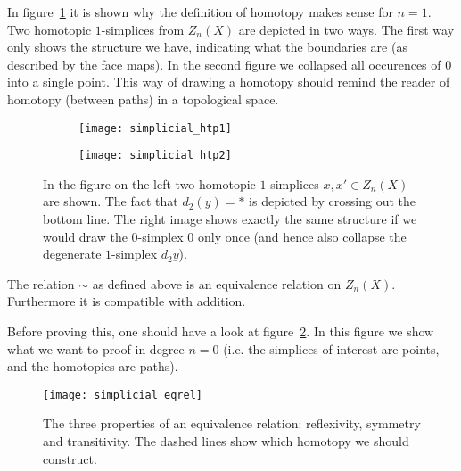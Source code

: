 In figure~\ref{fig:simplicial_htp} it is shown why the definition of homotopy makes sense for $n=1$. Two homotopic $1$-simplices from $Z_n(X)$ are depicted in two ways. The first way only shows the structure we have, indicating what the boundaries are (as described by the face maps). In the second figure we collapsed all occurences of $0$ into a single point. This way of drawing a homotopy should remind the reader of homotopy (between paths) in a topological space.

\begin{figure}[h!]
\begin{subfigure}{.5\textwidth}
  \centering
  \texttt{[image: simplicial\_htp1]}
\end{subfigure}%
\begin{subfigure}{.5\textwidth}
  \centering
  \texttt{[image: simplicial\_htp2]}
\end{subfigure}
\caption{In the figure on the left two homotopic $1$ simplices $x, x' \in Z_n(X)$ are shown. The fact that $d_2(y) = \ast$ is depicted by crossing out the bottom line. The right image shows exactly the same structure if we would draw the $0$-simplex $0$ only once (and hence also collapse the degenerate $1$-simplex $d_2y$).}
\label{fig:simplicial_htp}
\end{figure}

\begin{lemma}
	The relation $\sim$ as defined above is an equivalence relation on $Z_n(X)$. Furthermore it is compatible with addition.
\end{lemma}

Before proving this, one should have a look at figure~\ref{fig:simplicial_eqrel}. In this figure we show what we want to proof in degree $n=0$ (i.e. the simplices of interest are points, and the homotopies are paths).

\begin{figure}[h!]
\texttt{[image: simplicial\_eqrel]}
\caption{The three properties of an equivalence relation: reflexivity, symmetry and transitivity. The dashed lines show which homotopy we should construct.}
\label{fig:simplicial_eqrel}
\end{figure}

